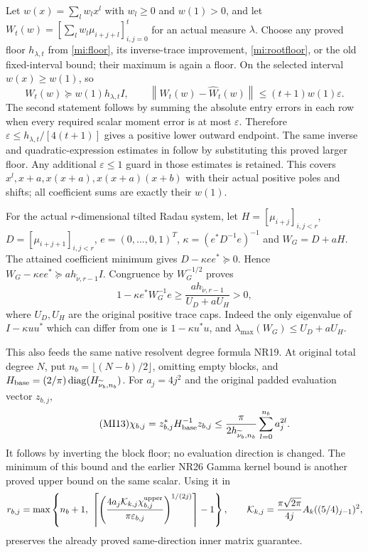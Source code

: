 \documentclass[11pt]{article}
\newcommand{\norm}[1]{\left\lVert#1\right\rVert}
\begin{document}
Let $w(x)=\sum_lw_lx^l$ with $w_l\ge0$ and $w(1)>0$, and let
$W_t(w)=[\sum_lw_l\mu_{i+j+l}]_{i,j=0}^t$ for an actual measure
$\lambda$. Choose any proved floor $h_{\lambda,t}$ from
\eqref{mi:floor}, its inverse-trace improvement, \eqref{mi:rootfloor},
or the old fixed-interval bound; their maximum is again a floor.
On the selected interval $w(x)\ge w(1)$, so
\begin{equation}\tag{MI11}\label{mi:weighted}
 W_t(w)\succeq w(1)h_{\lambda,t}I,\qquad
 \norm{W_t(w)-\widehat W_t(w)}
 \le(t+1)w(1)\varepsilon.
\end{equation}
The second statement follows by summing the absolute entry errors
in each row when every required scalar moment error is at most
$\varepsilon$. Therefore
$\varepsilon\le h_{\lambda,t}/[4(t+1)]$ gives a positive lower
outward endpoint. The same inverse and quadratic-expression estimates
in \cite{oldNP} follow by substituting this proved larger floor.
Any additional $\varepsilon\le1$ guard in those estimates is retained.
This covers $x^l,x+a,x(x+a),x(x+a)(x+b)$ with their actual positive
poles and shifts; all coefficient sums are exactly their $w(1)$.

For the actual $r$-dimensional tilted Radau system, let
$H=[\mu_{i+j}]_{i,j<r}$, $D=[\mu_{i+j+1}]_{i,j<r}$,
$e=(0,\ldots,0,1)^T$, $\kappa=(e^*D^{-1}e)^{-1}$ and
$W_G=D+aH$. The attained coefficient minimum gives
$D-\kappa ee^*\succeq0$. Hence
$W_G-\kappa ee^*\succeq a h_{\widetilde\nu,r-1}I$.
Congruence by $W_G^{-1/2}$ proves
\begin{equation}\tag{MI12}\label{mi:radau}
 1-\kappa e^*W_G^{-1}e
 \ge\frac{a h_{\widetilde\nu,r-1}}{U_D+aU_H}>0,
\end{equation}
where $U_D,U_H$ are the original positive trace caps.
Indeed the only eigenvalue of $I-\kappa uu^*$ which can differ
from one is $1-\kappa u^*u$, and
$\lambda_{\max}(W_G)\le U_D+aU_H$.

This also feeds the same native resolvent degree formula NR19.
At original total degree $N$, put $n_b=\lfloor(N-b)/2\rfloor$,
omitting empty blocks, and
$H_{\rm base}=(2/\pi)\operatorname{diag}(H_{\widetilde\nu_b,n_b})$.
For $a_j=4j^2$ and the original padded evaluation vector $z_{b,j}$,
\begin{equation}\tag{MI13}\label{mi:newchi}
 \chi_{b,j}=z_{b,j}^*H_{\rm base}^{-1}z_{b,j}
 \le \frac{\pi}{2h_{\widetilde\nu_b,n_b}}
          \sum_{l=0}^{n_b}a_j^{2l}.
\end{equation}
It follows by inverting the block floor; no evaluation direction is
changed. The minimum of this bound and the earlier NR26 Gamma
kernel bound is another proved upper bound on the same scalar.
Using it in
\[
 r_{b,j}=\max\left\{n_b+1,\
 \left\lceil\left(\frac{4a_j\mathcal K_{k,j}\chi_{b,j}^{\rm upper}}
 {\pi\varepsilon_{b,j}}\right)^{1/(2j)}\right\rceil-1\right\},\qquad
 \mathcal K_{k,j}=\frac{\pi\sqrt{2\pi}}{4j}A_k((5/4)_{j-1})^2,
\]
preserves the already proved same-direction inner matrix guarantee.
\end{document}
